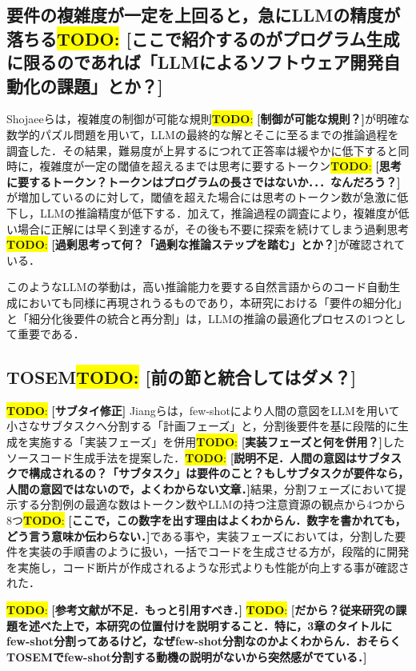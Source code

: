 \documentclass[submit,techrep,noauthor]{ipsj}
\newcommand{\todo}[1]{\colorbox{yellow}{{\bf TODO}:}{\color{red} {\textbf{[#1]}}}}
\begin{document}
\subsection{要件の複雑度が一定を上回ると，急にLLMの精度が落ちる\todo{ここで紹介するのがプログラム生成に限るのであれば「LLMによるソフトウェア開発自動化の課題」とか？}}
Shojaeeら\cite{IllusionApple}は，複雑度の制御が可能な規則\todo{制御が可能な規則？}が明確な数学的パズル問題を用いて，LLMの最終的な解とそこに至るまでの推論過程を調査した．その結果，難易度が上昇するにつれて正答率は緩やかに低下すると同時に，複雑度が一定の閾値を超えるまでは思考に要するトークン\todo{思考に要するトークン？トークンはプログラムの長さではないか．．．なんだろう？}が増加しているのに対して，閾値を超えた場合には思考のトークン数が急激に低下し，LLMの推論精度が低下する．加えて，推論過程の調査により，複雑度が低い場合に正解には早く到達するが，その後も不要に探索を続けてしまう過剰思考\todo{過剰思考って何？「過剰な推論ステップを踏む」とか？}が確認されている．

このようなLLMの挙動は，高い推論能力を要する自然言語からのコード自動生成においても同様に再現されうるものであり，本研究における「要件の細分化」と「細分化後要件の統合と再分割」は，LLMの推論の最適化プロセスの1つとして重要である．


\subsection{TOSEM\todo{前の節と統合してはダメ？}}\todo{サブタイ修正}
Jiangら\cite{tosem}は，few-shotにより人間の意図をLLMを用いて小さなサブタスクへ分割する「計画フェーズ」と，分割後要件を基に段階的に生成を実施する「実装フェーズ」を併用\todo{実装フェーズと何を併用？}したソースコード生成手法を提案した．\todo{説明不足．人間の意図はサブタスクで構成されるの？「サブタスク」は要件のこと？もしサブタスクが要件なら，人間の意図ではないので，よくわからない文章．}結果，分割フェーズにおいて提示する分割例の最適な数はトークン数やLLMの持つ注意資源の観点から4つから8つ\todo{ここで，この数字を出す理由はよくわからん．数字を書かれても，どう言う意味か伝わらない．}である事や，実装フェーズにおいては，分割した要件を実装の手順書のように扱い，一括でコードを生成させる方が，段階的に開発を実施し，コード断片が作成されるような形式よりも性能が向上する事が確認された．


\todo{参考文献が不足．もっと引用すべき．}
\todo{だから？従来研究の課題を述べた上で，本研究の位置付けを説明すること．特に，3章のタイトルにfew-shot分割ってあるけど，なぜfew-shot分割なのかよくわからん．おそらく TOSEMでfew-shot分割する動機の説明がないから突然感がでている．}
\end{document}
